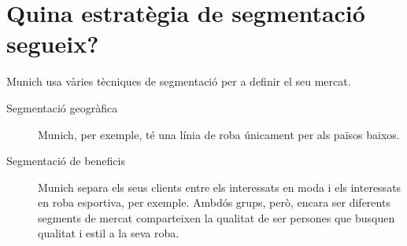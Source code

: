\section{Quina estratègia de segmentació segueix?}

Munich usa vàries tècniques de segmentació per a definir el seu mercat.

\begin{description}
  \item[Segmentació geogràfica] Munich, per exemple, té una línia de roba 
  únicament per als països baixos.
  \item[Segmentació de beneficis] Munich separa els seus clients entre els
  interessats en moda i els interessats en roba esportiva, per exemple. Ambdós
  grups, però, encara ser diferents segments de mercat comparteixen la qualitat
  de ser persones que busquen qualitat i estil a la seva roba.
\end{description}
